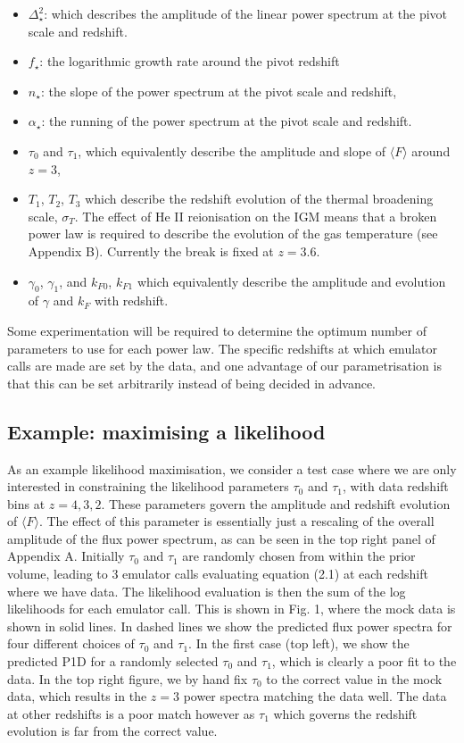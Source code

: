 \documentclass[]{article}
\begin{document}
\begin{itemize}
    \item $\Delta^2_\star$: which describes the amplitude of the linear power spectrum at 
    the pivot scale and redshift.
    \item $f_\star$: the logarithmic growth rate around the pivot redshift
    \item $n_\star$: the slope of the power spectrum at the pivot scale and redshift,
    \item $\alpha_\star$: the running of the power spectrum at the pivot scale and redshift.
    \item  $\tau_0$ and $\tau_1$, which equivalently describe the amplitude and slope of $\langle F\rangle$ around $z=3$,
    \item  $T_1$, $T_2$, $T_3$ which describe the redshift evolution of the thermal 
    broadening scale, $\sigma_T$. The effect of He II reionisation on the IGM means that 
    a broken power law is required to describe the evolution of the gas temperature (see 
    Appendix B). Currently the break is fixed at $z=3.6$.
    \item $\gamma_0$, $\gamma_1$, and $k_{F0}$, $k_{F1}$ which equivalently describe the amplitude and evolution of $\gamma$ and $k_F$ with redshift.
\end{itemize}

\noindent Some experimentation will be required to determine the optimum number of 
parameters to use for each power law. The specific redshifts at which emulator calls are 
made are set by the data, and one advantage of our parametrisation is that this can be 
set arbitrarily instead of being decided in advance.

\subsection{Example: maximising a likelihood}
As an example likelihood maximisation, we consider a test case where we are only interested 
in constraining the likelihood parameters $\tau_0$ and $\tau_1$, with data redshift bins 
at $z=4,3,2$. These parameters govern the amplitude and redshift evolution of $\langle F\rangle$.
The effect of this parameter is essentially just a rescaling of the overall amplitude of the flux
power spectrum, as can be seen in the top right panel of Appendix A.
Initially $\tau_0$ and $\tau_1$ are randomly chosen from within the prior 
volume, leading to 3 emulator calls evaluating equation (2.1) at each redshift where we 
have data. The likelihood evaluation is then the sum of the log likelihoods for each 
emulator call. This is shown in Fig. 1, where the mock data is shown in solid lines.
In dashed lines we show the predicted flux power spectra for four different choices of
$\tau_0$ and $\tau_1$. In the first case (top left), we show the predicted P1D for a randomly selected
$\tau_0$ and $\tau_1$, which is clearly a poor fit to the data. In the top right figure,
we by hand fix $\tau_0$ to the correct value in the mock data, which results in the
$z=3$ power spectra matching the data well. The data at other redshifts is a poor match
however as $\tau_1$ which governs the redshift evolution is far from the correct value.
\end{document}
